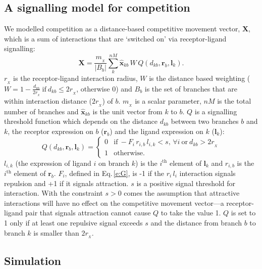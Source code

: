 \documentclass[11pt, a4paper]{article}
\begin{document}
\subsection*{A signalling model for competition}
 
 We modelled competition as a distance-based competitive movement vector, $\mathbf{X}$, which is a sum of interactions that are `switched on' via receptor-ligand signalling:
%
\begin{equation} \label{e:X}
\mathbf{X} = \frac{m_{\!_X}}{|B_{b}|} \sum_k^{nM} \hat{\mathbf{x}}_{kb}\,W\,Q(d_{kb}, \mathbf{r}_{b}, \mathbf{l}_{k}).
\end{equation}
%
$r_{\!_X}$ is the receptor-ligand interaction radius, $W$ is the distance based weighting ($W = 1-\frac{d_{kb}}{2r_{\!_X}}~\mathrm{if}~  d_{kb}\leq 2r_{\!_X}$, otherwise $0$) and $B_{b}$ is the set of branches that are within interaction distance ($2 r_{\!_X}$) of $b$. $m_{\!_X}$ is a scalar parameter, $nM$ is the total number of branches and $\hat{\mathbf{x}}_{kb}$ is the unit vector from $k$ to $b$.
%
$Q$ is a signalling threshold function which depends on the distance $d_{kb}$ between two branches $b$ and $k$, the receptor expression on $b$ ($\mathbf{r}_b$) and the ligand expression on $k$ ($\mathbf{l}_k$):
%
\begin{equation}
Q(d_{kb}, \mathbf{r}_{b}, \mathbf{l}_{k}) = \begin{cases}
                 0 & \mathrm{if}~-F_i\,r_{i,b}\,l_{i,k} <
                 s,\,\forall{i}~\mathrm{or}~d_{kb} > 2r_{\!_X} \\
                 1 & \mathrm{otherwise.}
     \end{cases}
\end{equation}
%
$l_{i,k}$ (the expression of ligand $i$ on branch $k$) is the $i^{\mathrm{th}}$ element of $\mathbf{l}_k$ and $r_{i,b}$ is the $i^{\mathrm{th}}$ element of $\mathbf{r}_b$. 
$F_i$, defined in Eq.\,\ref{e:G}, is -1 if the $r_{i}\,l_{i}$ interaction signals repulsion and +1 if it signals attraction.
$s$ is a positive signal threshold for interaction.
With the constraint $s>0$ comes the assumption that attractive interactions will have no effect on the competitive movement vector---a receptor-ligand pair that signals attraction cannot cause $Q$ to take the value 1. 
$Q$ is set to 1 only if at least one repulsive signal exceeds $s$ and the distance from branch $b$ to branch $k$ is smaller than $2 r_{\!_X}$.

\subsection*{Simulation}
\end{document}
